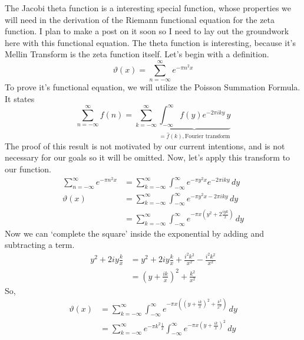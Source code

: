 \documentclass{article}
\begin{document}
\par The Jacobi theta function is a interesting special function, whose properties we will need in the derivation of the Riemann functional equation for the zeta function. I plan to make a post on it soon so I need to lay out the groundwork here with this functional equation. The theta function is interesting, because it's Mellin Transform is the zeta function itself. Let's begin with a definition.
\begin{equation*}
    \vartheta(x)=\sum_{n=-\infty}^{\infty} e^{-\pi n^2x}
\end{equation*}
To prove it's functional equation, we will utilize the Poisson Summation Formula. It states
\begin{equation*}
    \sum_{n=-\infty}^{\infty} f(n)= \sum_{k=-\infty}^{\infty} \underbrace{\int_{-\infty}^{\infty} f(y)e^{-2\pi i k y}\,y}_{=\hat{f}(k), \text{Fourier transform}}
\end{equation*}
The proof of this result is not motivated by our current intentions, and is not necessary for our goals so it will be omitted. Now, let's apply this transform to our function. 
\begin{equation*}
    \begin{split}
        \sum_{n=-\infty}^{\infty} e^{-\pi n^2x}&= \sum_{k=-\infty}^{\infty} \int_{-\infty}^{\infty}e^{-\pi y^2x}e^{-2\pi i k y}\,dy \\
         \vartheta(x)&= \sum_{k=-\infty}^{\infty} \int_{-\infty}^{\infty} e^{-\pi y^2x-2\pi i k y}\,dy \\
         &= \sum_{k=-\infty}^{\infty} \int_{-\infty}^{\infty} e^{{-\pi x( y^2+2 \frac{iyk}{x})}}\,dy 
    \end{split} 
\end{equation*} Now we can `complete the square' inside the exponential by adding and subtracting a term. 
\begin{equation*}
\begin{split}
     y^2+2 i y\frac{k}{x}&= y^2+2 i y\frac{k}{x}+\frac{i^2k^2}{x^2}-\frac{i^2k^2}{x^2} \\
     &= \left(y+\frac{ik}{x}\right)^2+\frac{k^2}{x^2}
     \end{split}
\end{equation*}
So,
\begin{equation*}
    \begin{split}
        \vartheta(x)&= \sum_{k=-\infty}^{\infty} \int_{-\infty}^{\infty} e^{-\pi x\left(\left(y+\frac{ik}{x}\right)^2+\frac{k^2}{x^2}\right)} \,dy \\ 
        &= \sum_{k=-\infty}^{\infty} e^{-\pi k^2 \frac{1}{x}}\int_{-\infty}^{\infty} e^{-\pi x\left(y+\frac{ik}{x}\right)^2}\,dy
    \end{split}
\end{equation*}
\end{document}
